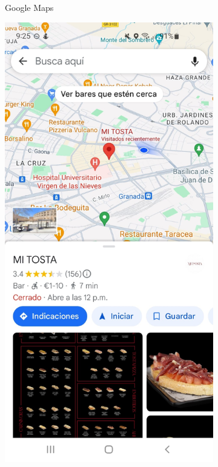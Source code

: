 \begin{figure}[H]
\begin{subfigure}{.3\textwidth}
        \caption{Google Maps}
        \label{fig:img1}
    \end{subfigure}%
    \hfill
    \begin{subfigure}{.3\textwidth}
        \centering
        \includegraphics[width=\linewidth]{imagenes/Maps.jpeg}

\end{subfigure}
\end{figure}
